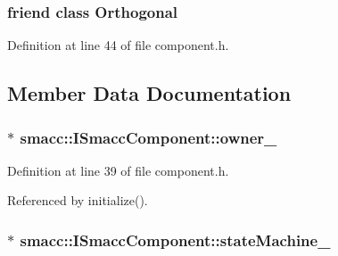 \subsubsection[{\texorpdfstring{Orthogonal}{Orthogonal}}]{\setlength{\rightskip}{0pt plus 5cm}friend class {\bf Orthogonal}\hspace{0.3cm}{\ttfamily [friend]}}\hypertarget{classsmacc_1_1ISmaccComponent_ab3e0a1388d84ea577a59f487cbfc08e3}{}\label{classsmacc_1_1ISmaccComponent_ab3e0a1388d84ea577a59f487cbfc08e3}


Definition at line 44 of file component.\+h.



\subsection{Member Data Documentation}
\subsubsection[{\texorpdfstring{owner\+\_\+}{owner_}}]{$\ast$ smacc\+::\+I\+Smacc\+Component\+::owner\+\_\+\hspace{0.3cm}{\ttfamily [protected]}}\hypertarget{classsmacc_1_1ISmaccComponent_a909590e672450ce0eb0d8facb45c737a}{}\label{classsmacc_1_1ISmaccComponent_a909590e672450ce0eb0d8facb45c737a}


Definition at line 39 of file component.\+h.



Referenced by initialize().

\subsubsection[{\texorpdfstring{state\+Machine\+\_\+}{stateMachine_}}]{$\ast$ smacc\+::\+I\+Smacc\+Component\+::state\+Machine\+\_\+\hspace{0.3cm}{\ttfamily [protected]}}\hypertarget{classsmacc_1_1ISmaccComponent_ae3f37acc1679f79299b86872d4b1f80f}{}\label{classsmacc_1_1ISmaccComponent_ae3f37acc1679f79299b86872d4b1f80f}


